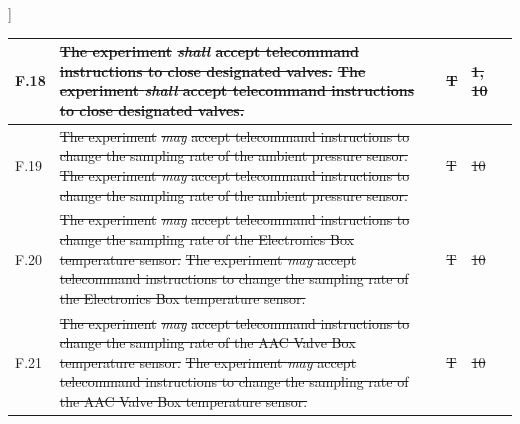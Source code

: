 ]\documentclass[a4paper,12pt,twoside]{article}
\providecommand{\DIFaddtex}[1]{{\protect\color{blue}\uwave{#1}}} %
\providecommand{\DIFdeltex}[1]{{\protect\color{red}\sout{#1}}}                      %
\providecommand{\DIFaddbegin}{} %
\providecommand{\DIFaddend}{} %
\providecommand{\DIFdelbegin}{} %
\providecommand{\DIFdelend}{} %
\providecommand{\DIFadd}[1]{\texorpdfstring{\DIFaddtex{#1}}{#1}} %
\providecommand{\DIFdel}[1]{\texorpdfstring{\DIFdeltex{#1}}{}} %
\newcommand{\DIFscaledelfig}{0.5}
\newlength{\DIFdelgraphicswidth} %
\newlength{\DIFdelgraphicsheight} %
\newcommand{\DIFaddincludegraphics}[2][]{{\color{blue}\fbox{\DIFOincludegraphics[#1]{#2}}}} %
\newcommand{\DIFdelincludegraphics}[2][]{%
\sbox{\DIFdelgraphicsbox}{\DIFOincludegraphics[#1]{#2}}%
\settoboxwidth{\DIFdelgraphicswidth}{\DIFdelgraphicsbox} %
\settoboxtotalheight{\DIFdelgraphicsheight}{\DIFdelgraphicsbox} %
\scalebox{\DIFscaledelfig}{%
\parbox[b]{\DIFdelgraphicswidth}{\usebox{\DIFdelgraphicsbox}\\[-\baselineskip] \rule{\DIFdelgraphicswidth}{0em}}\llap{\resizebox{\DIFdelgraphicswidth}{\DIFdelgraphicsheight}{%
\setlength{\unitlength}{\DIFdelgraphicswidth}%
\begin{picture}(1,1)%
\thicklines\linethickness{2pt} %
{\color[rgb]{1,0,0}\put(0,0){\framebox(1,1){}}}%
{\color[rgb]{1,0,0}\put(0,0){\line( 1,1){1}}}%
{\color[rgb]{1,0,0}\put(0,1){\line(1,-1){1}}}%
\end{picture}%
}\hspace*{3pt}}} %
} %
\DeclareRobustCommand{\DIFaddbegin}{\DIFOaddbegin \let\includegraphics\DIFaddincludegraphics} %
\DeclareRobustCommand{\DIFaddend}{\DIFOaddend \let\includegraphics\DIFOincludegraphics} %
\DeclareRobustCommand{\DIFdelbegin}{\DIFOdelbegin \let\includegraphics\DIFdelincludegraphics} %
\DeclareRobustCommand{\DIFdelend}{\DIFOaddend \let\includegraphics\DIFOincludegraphics} %
\begin{document}
\begin{longtable}[]{|m{}| m{} |m{} |m{}|m{}|}
F.18 & \DIFdelbegin \DIFdel{The experiment }\textit{\DIFdel{shall}} %
\DIFdel{accept telecommand instructions to close designated valves.                                                                                        }\DIFdelend \DIFaddbegin \st{The experiment \textit{shall} accept telecommand instructions to close designated valves.}\DIFadd{\textsuperscript{\ref{fn:unnecessary-requirement}}                                                                                         }\DIFaddend &      \DIFdelbegin \DIFdel{T        }\DIFdelend \DIFaddbegin \DIFadd{-     }\DIFaddend & \DIFdelbegin \DIFdel{1, 10            }\DIFdelend \DIFaddbegin \DIFadd{-            }\DIFaddend &        \\ \hline
F.19 & \DIFdelbegin \DIFdel{The experiment }\textit{\DIFdel{may}} %
\DIFdel{accept telecommand instructions to change the sampling rate of the ambient pressure sensor.                                                          }\DIFdelend \DIFaddbegin \st{The experiment \textit{may} accept telecommand instructions to change the sampling rate of the ambient pressure sensor.}\DIFadd{\textsuperscript{\ref{fn:unnecessary-requirement}}                                                           }\DIFaddend &     \DIFdelbegin \DIFdel{T         }\DIFdelend \DIFaddbegin \DIFadd{-         }\DIFaddend & \DIFdelbegin \DIFdel{10            }\DIFdelend \DIFaddbegin \DIFadd{-          }\DIFaddend &        \\ \hline
F.20 & \DIFdelbegin \DIFdel{The experiment }\textit{\DIFdel{may}} %
\DIFdel{accept telecommand instructions to change the sampling rate of the Electronics Box temperature sensor.                                                       }\DIFdelend \DIFaddbegin \st{The experiment \textit{may} accept telecommand instructions to change the sampling rate of the Electronics Box temperature sensor.}\DIFadd{\textsuperscript{\ref{fn:unnecessary-requirement}}                                                        }\DIFaddend &      \DIFdelbegin \DIFdel{T        }\DIFdelend \DIFaddbegin \DIFadd{-       }\DIFaddend & \DIFdelbegin \DIFdel{10            }\DIFdelend \DIFaddbegin \DIFadd{-            }\DIFaddend &        \\ \hline
F.21 & \DIFdelbegin \DIFdel{The experiment }\textit{\DIFdel{may}} %
\DIFdel{accept telecommand instructions to change the sampling rate of the AAC Valve Box temperature sensor.                                                 }\DIFdelend \DIFaddbegin \st{The experiment \textit{may} accept telecommand instructions to change the sampling rate of the AAC Valve Box temperature sensor.}\DIFadd{\textsuperscript{\ref{fn:unnecessary-requirement}}                                                  }\DIFaddend &      \DIFdelbegin \DIFdel{T        }\DIFdelend \DIFaddbegin \DIFadd{-       }\DIFaddend & \DIFdelbegin \DIFdel{10            }\DIFdelend \DIFaddbegin \DIFadd{-            }\DIFaddend &        \\ \hline

\end{longtable}
\end{document}
